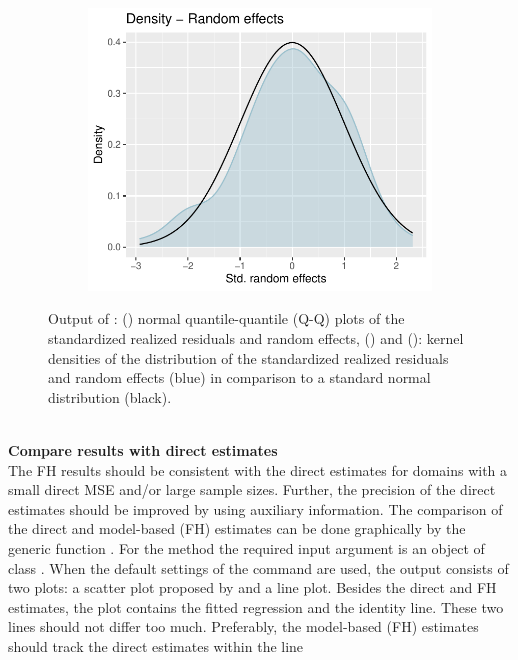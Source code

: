 \begin{figure}[h!]
\begin{subfigure}{0.48\textwidth}
		\centering
		\includegraphics[width=1\linewidth]{./figures/plot3}
		\caption{}
		\label{fig:plotc}
	\end{subfigure}
	\caption{Output of : () normal quantile-quantile
		(Q-Q) plots of the standardized realized residuals
		and random effects, () and (): kernel densities
		of the distribution of the standardized realized residuals
		and random effects (blue) in comparison to a standard normal distribution (black).}
	\label{fig:plot}
\end{figure}
%
\\ \newline
\textbf{Compare results with direct estimates} \\
The FH results should be consistent with the direct estimates for domains with
a small direct MSE and/or large sample sizes. Further, the precision of the direct
estimates should be improved by using auxiliary information. The comparison of
the direct and model-based (FH) estimates can be done graphically by the generic
function . For the  method the required input argument
is an object of class . When the default settings of the command are
used, the output consists of two plots: a scatter plot proposed by \citet{Brown2001}
and a line plot. Besides the direct and FH estimates, the plot contains the fitted
regression and the identity line. These two lines should not differ too much. Preferably,
the model-based (FH) estimates should track the direct estimates within the line
